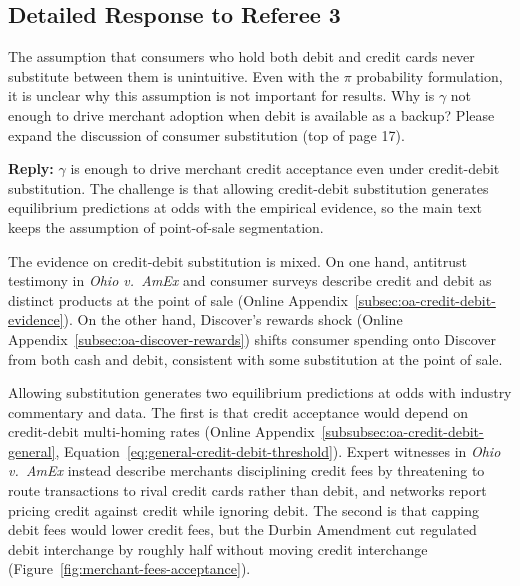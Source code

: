 \documentclass[main.tex]{subfiles}
\begin{document}
\begin{refsection}


\section*{Detailed Response to Referee 3}

\begin{refcommentnoclear}
The assumption that consumers who hold both debit and credit cards never substitute between them is unintuitive.
Even with the $\pi$ probability formulation, it is unclear why this assumption is not important for results.
Why is $\gamma$ not enough to drive merchant adoption when debit is available as a backup?
Please expand the discussion of consumer substitution (top of page 17).

\end{refcommentnoclear}

\textbf{Reply:} $\gamma$ is enough to drive merchant credit acceptance even under credit-debit substitution.
The challenge is that allowing credit-debit substitution generates equilibrium predictions at odds with the empirical evidence, so the main text keeps the assumption of point-of-sale segmentation.

The evidence on credit-debit substitution is mixed.
On one hand, antitrust testimony in \emph{Ohio v.\ AmEx} and consumer surveys describe credit and debit as distinct products at the point of sale (Online Appendix~\ref{subsec:oa-credit-debit-evidence}).
On the other hand, Discover's rewards shock (Online Appendix~\ref{subsec:oa-discover-rewards}) shifts consumer spending onto Discover from both cash and debit, consistent with some substitution at the point of sale.

Allowing substitution generates two equilibrium predictions at odds with industry commentary and data.
The first is that credit acceptance would depend on credit-debit multi-homing rates (Online Appendix~\ref{subsubsec:oa-credit-debit-general}, Equation~\ref{eq:general-credit-debit-threshold}).
Expert witnesses in \emph{Ohio v.\ AmEx} instead describe merchants disciplining credit fees by threatening to route transactions to rival credit cards rather than debit, and networks report pricing credit against credit while ignoring debit.
The second is that capping debit fees would lower credit fees, but the Durbin Amendment cut regulated debit interchange by roughly half without moving credit interchange (Figure~\ref{fig:merchant-fees-acceptance}).


\end{refsection}
\end{document}
